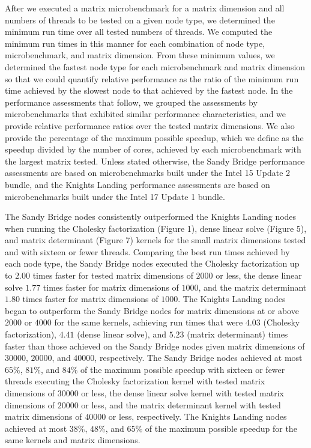 After we executed a matrix microbenchmark for a matrix dimension and all numbers
  of threads to be tested on a given node type, we determined the minimum run
  time over all tested numbers of threads.
We computed the minimum run times in this manner for each combination of node
  type, microbenchmark, and matrix dimension.
From these minimum values, we determined the fastest node type for each
  microbenchmark and matrix dimension so that we could quantify relative
  performance as the ratio of the minimum run time achieved by the slowest node
  to that achieved by the fastest node.
In the performance assessments that follow, we grouped the assessments by microbenchmarks
  that exhibited similar performance characteristics, and we provide relative performance
  ratios over the tested matrix dimensions.
We also provide the percentage of the maximum possible speedup, which we define
  as the speedup divided by the number of cores, achieved by each microbenchmark
  with the largest matrix tested.
Unless stated otherwise, the Sandy Bridge performance assessments are based on
  microbenchmarks built under the Intel 15 Update 2 bundle, and the Knights
  Landing performance assessments are based on microbenchmarks built under the
  Intel 17 Update 1 bundle.

%
%
%
The Sandy Bridge nodes consistently outperformed the Knights Landing nodes when
  running the Cholesky factorization (Figure 1), dense linear solve (Figure 5),
  and matrix determinant (Figure 7) kernels for the small matrix dimensions
  tested and with sixteen or fewer threads.
Comparing the best run times achieved by each node type, the Sandy Bridge nodes
  executed the Cholesky factorization up to $2.00$ times faster for tested
  matrix dimensions of $2000$ or less, the dense linear solve $1.77$ times
  faster for matrix dimensions of $1000$, and the matrix determinant $1.80$
  times faster for matrix dimensions of $1000$.
The Knights Landing nodes began to outperform the Sandy Bridge nodes for matrix
  dimensions at or above $2000$ or $4000$ for the same kernels, achieving run
  times that were $4.03$ (Cholesky factorization), $4.41$ (dense linear solve),
  and $5.23$ (matrix determinant) times faster than those achieved on the Sandy
  Bridge nodes given matrix dimensions of $30000$, $20000$, and $40000$,
  respectively.
The Sandy Bridge nodes achieved at most $65\%$, $81\%$, and $84\%$ of the
  maximum possible speedup with sixteen or fewer threads executing the Cholesky
  factorization kernel with tested matrix dimensions of $30000$ or less, the
  dense linear solve kernel with tested matrix dimensions of $20000$ or less,
  and the matrix determinant kernel with tested matrix dimensions of $40000$ or
  less, respectively.
The Knights Landing nodes achieved at most $38\%$, $48\%$, and $65\%$ of the
  maximum possible speedup for the same kernels and matrix dimensions.

